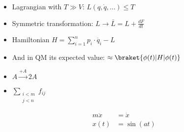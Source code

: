 \begin{itemize} %
	\item Lagrangian with $T \gg V$: $L(q, \dot{q}, \dots ) \leq T$
	\item Symmetric transformation: $L \to \bar L = L + \frac{dF}{dt}$
	\item Hamiltonian $H=\sum_{i=1}^ n p_i \cdot \dot{q_i} - L$
	\item And in QM its expected value: $\approx \braket{\phi(t) | H | \phi(t)}$
	\item $A \xrightarrow{+A} 2A$
	\item $\sum_{\substack{i<m \\ j<n}} f_{ij}$
\end{itemize}

\begin{align}
  m \ddot{x} &= \dot{x} \\
  x(t)  &= \sin(at)
\end{align}
